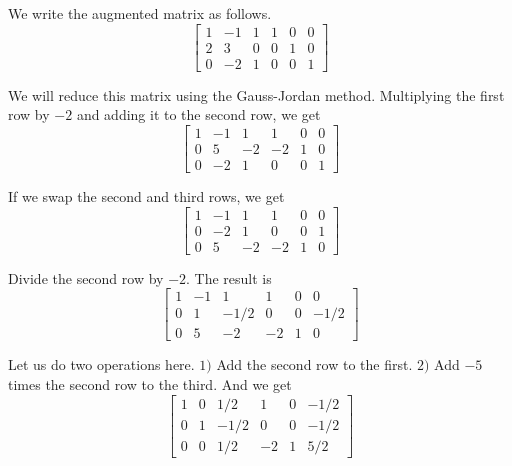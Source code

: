 \begin{solution}
    We write the augmented matrix as follows.
    \[ \left[
            \begin{array}{ccc|ccc}
                1 & -1 & 1 & 1 & 0 & 0 \\
                2 & 3  & 0 & 0 & 1 & 0 \\
                0 & -2 & 1 & 0 & 0 & 1
            \end{array}
            \right] \]

    We will reduce this matrix using the Gauss-Jordan method. Multiplying the first row by \(-2\) and adding it to the second row, we get
    \[ \left[
            \begin{array}{ccc|ccc}
                1 & -1 & 1  & 1  & 0 & 0 \\
                0 & 5  & -2 & -2 & 1 & 0 \\
                0 & -2 & 1  & 0  & 0 & 1
            \end{array}
            \right] \]

    If we swap the second and third rows, we get
    \[ \left[
            \begin{array}{ccc|ccc}
                1 & -1 & 1  & 1  & 0 & 0 \\
                0 & -2 & 1  & 0  & 0 & 1 \\
                0 & 5  & -2 & -2 & 1 & 0
            \end{array}
            \right] \]

    Divide the second row by \(-2\). The result is
    \[ \left[
            \begin{array}{ccc|ccc}
                1 & -1 & 1    & 1  & 0 & 0    \\
                0 & 1  & -1/2 & 0  & 0 & -1/2 \\
                0 & 5  & -2   & -2 & 1 & 0
            \end{array}
            \right] \]

    Let us do two operations here. \(1)\) Add the second row to the first. \(2)\) Add \(-5\) times the second row to the third. And we get
    \[ \left[
            \begin{array}{ccc|ccc}
                1 & 0 & 1/2  & 1  & 0 & -1/2 \\
                0 & 1 & -1/2 & 0  & 0 & -1/2 \\
                0 & 0 & 1/2  & -2 & 1 & 5/2
            \end{array}
            \right] \]


\end{solution}
